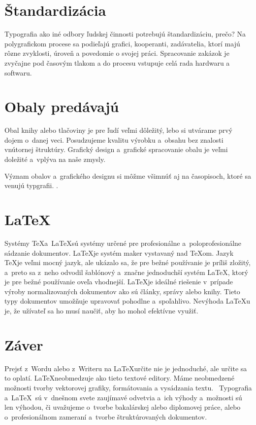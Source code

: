 \documentclass[11pt,a4paper,titlepage]{article}
\begin{document}
\section{Štandardizácia}
Typografia ako iné odbory ľudskej činnosti potrebujú štandardizáciu, prečo? Na polygrafickom procese sa podieľajú grafici, kooperanti, zadávatelia, ktorí majú rôzne zvyklosti, úroveň a povedomie o svojej práci.  Spracovanie zakázok je zvyčajne pod časovým tlakom a do procesu vstupuje celá rada hardwaru a softwaru.\cite{Zapotocky}

\section{Obaly predávajú}
Obal knihy alebo tlačoviny je pre ľudí veľmi dôležitý, lebo si utvárame prvý dojem o~danej veci. Posudzujeme kvalitu výrobku a~obsahu bez znalosti vnútornej štruktúry. Grafický design a~grafické spracovanie obalu je veľmi doležité a~vplýva na naše zmysly.\cite{Sedlacek}

Význam obalov a~grafického designu si môžme všimnúť aj na časopisoch, ktoré sa venujú typgrafii. \cite{Digirama}.

\section{\LaTeX}
Systémy \TeX a~\LaTeX sú systémy určené pre profesionálne a~poloprofesionálne sádzanie dokumentov. \LaTeX je systém maker vystavaný nad \TeX om. Jazyk \TeX je veľmi mocný jazyk, ale ukázalo sa, že pre bežné používanie je príliš zložitý, a~preto sa z~neho odvodil šablónový a~značne jednoduchší systém \LaTeX , ktorý je pre bežné používanie oveľa vhodnejší. \cite{Martinek}
\LaTeX je ideálné riešenie v~prípade výroby normalizovaných dokumentov ako sú články, správy alebo knihy. Tieto typy dokumentov umožňuje upravovať pohodlne a~spoľahlivo. Nevýhoda \LaTeX u je, že užívateľ sa ho musí naučiť, aby ho mohol efektívne využiť.\cite{Sopuch}

\newpage
\section{Záver}
Prejsť z~Wordu alebo z~Writeru na \LaTeX určite nie je jednoduché, ale určite sa to oplatí.  \LaTeX neobmedzuje ako tieto textové editory. Máme neobmedzené možnosti tvorby vektorovej grafiky, formátovania a vysádzania textu.~\cite{Found}
Typografia a~\LaTeX \ sú v~dnešnom svete  zaujímavé odvetvia a~ich výhody a~možnosti sú len výhodou, či uvažujeme o~tvorbe bakalárskej alebo diplomovej práce, alebo o~profesionálnom zameraní a~tvorbe štruktúrovaných dokumentov.
\newpage
\renewcommand{\refname}{Referencie}

\end{document}
